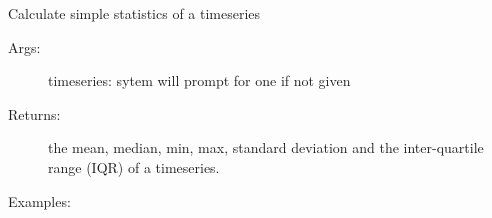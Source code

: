 \documentclass[letterpaper,10pt,english]{sphinxmanual}
\begin{document}
\begin{fulllineitems}
\label{\detokenize{Main:pyleoclim.statsTs}}
Calculate simple statistics of a timeseries
\begin{description}
\item[{Args:}] \leavevmode
timeseries: sytem will prompt for one if not given

\item[{Returns:}] \leavevmode
the mean, median, min, max, standard deviation and the
inter-quartile range (IQR) of a timeseries.

\item[{Examples:}] \leavevmode
{}%
\begin{sphinxVerbatim}[commandchars=\\\{\}]
       
\end{sphinxVerbatim}

\end{description}

\end{fulllineitems}

\end{document}
